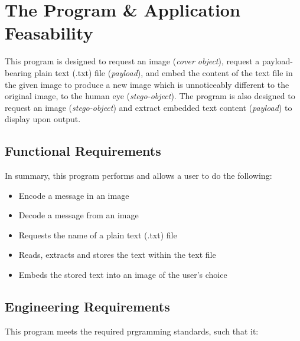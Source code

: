 \documentclass[11pt, english]{article}
\begin{document}
\newpage

\section{The Program \& Application Feasability}

	This program is designed to request an image (\textit{cover object}), request a payload-bearing plain text (.txt) file (\textit{payload}), and embed the content of the text file in the given image to produce a new image which is unnoticeably different to the original image, to the human eye (\textit{stego-object}). The program is also designed to request an image (\textit{stego-object}) and extract embedded text content (\textit{payload}) to display upon output.

	\subsection{Functional Requirements}

	In summary, this program performs and allows a user to do the following:

	\begin{itemize}
        \setlength\itemsep{0cm}
		\item Encode a message in an image
		\item Decode a message from an image
		\item Requests the name of a plain text (.txt) file
		\item Reads, extracts and stores the text within the text file
		\item Embeds the stored text into an image of the user's choice
        \end{itemize}

	\subsection{Engineering Requirements}

	This program meets the required prgramming standards, such that it:
\end{document}

